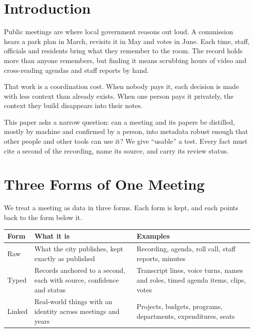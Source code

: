 \documentclass[
  american,
  letterpaper,
  11pt]{article}
\begin{document}
\section{Introduction}\label{introduction}

Public meetings are where local government reasons out loud.
A commission hears a park plan in March, revisits it in May and votes in June.
Each time, staff, officials and residents bring what they remember to the room.
The record holds more than anyone remembers, but finding it means scrubbing hours of video and cross-reading agendas and staff reports by hand.

That work is a coordination cost.
When nobody pays it, each decision is made with less context than already exists.
When one person pays it privately, the context they build disappears into their notes.

This paper asks a narrow question: can a meeting and its papers be distilled, mostly by machine and confirmed by a person, into metadata robust enough that other people and other tools can use it?
We give ``usable'' a test.
Every fact must cite a second of the recording, name its source, and carry its review status.

\section{Three Forms of One Meeting}\label{three-forms-of-one-meeting}

We treat a meeting as data in three forms.
Each form is kept, and each points back to the form below it.

{\def\LTcaptype{} %
\begin{longtable}[]{@{}
  >{\raggedright\arraybackslash}p{}
  >{\raggedright\arraybackslash}p{}
  >{\raggedright\arraybackslash}p{}@{}}
\toprule\noalign{}
\begin{minipage}[b]{\linewidth}\raggedright
Form
\end{minipage} & \begin{minipage}[b]{\linewidth}\raggedright
What it is
\end{minipage} & \begin{minipage}[b]{\linewidth}\raggedright
Examples
\end{minipage} \\
\midrule\noalign{}
\endhead
\bottomrule\noalign{}
\endlastfoot
Raw & What the city publishes, kept exactly as published & Recording, agenda, roll call, staff reports, minutes \\
Typed & Records anchored to a second, each with source, confidence and status & Transcript lines, voice turns, names and roles, timed agenda items, clips, votes \\
Linked & Real-world things with an identity across meetings and years & Projects, budgets, programs, departments, expenditures, seats \\
\end{longtable}
}
\end{document}
